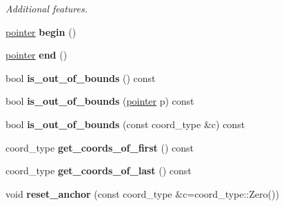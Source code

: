 \begin{DoxyCompactItemize}
\begin{DoxyCompactList}\small\item\em Additional features. \end{DoxyCompactList}\item 
\hypertarget{class_d_o_1_1_locator_ab90f1f06efb41eee9fb48cd37dfbdccd}{\hyperlink{class_d_o_1_1_locator_aa2158dc2d25210ef557a40d3b8a521e3}{pointer} {\bfseries begin} ()}\label{class_d_o_1_1_locator_ab90f1f06efb41eee9fb48cd37dfbdccd}

\item 
\hypertarget{class_d_o_1_1_locator_a13c6690dd32b33d4bc6e3ae6897ca432}{\hyperlink{class_d_o_1_1_locator_aa2158dc2d25210ef557a40d3b8a521e3}{pointer} {\bfseries end} ()}\label{class_d_o_1_1_locator_a13c6690dd32b33d4bc6e3ae6897ca432}

\item 
\hypertarget{class_d_o_1_1_locator_a1bcb35403b8b8b24885e62614ac7619f}{bool {\bfseries is\-\_\-out\-\_\-of\-\_\-bounds} () const }\label{class_d_o_1_1_locator_a1bcb35403b8b8b24885e62614ac7619f}

\item 
\hypertarget{class_d_o_1_1_locator_acb17ad0e9cac4a4740fcb8ade0825ebc}{bool {\bfseries is\-\_\-out\-\_\-of\-\_\-bounds} (\hyperlink{class_d_o_1_1_locator_aa2158dc2d25210ef557a40d3b8a521e3}{pointer} p) const }\label{class_d_o_1_1_locator_acb17ad0e9cac4a4740fcb8ade0825ebc}

\item 
\hypertarget{class_d_o_1_1_locator_a5f837e03969e4f1af33017f9dea5b960}{bool {\bfseries is\-\_\-out\-\_\-of\-\_\-bounds} (const coord\-\_\-type \&c) const }\label{class_d_o_1_1_locator_a5f837e03969e4f1af33017f9dea5b960}

\item 
\hypertarget{class_d_o_1_1_locator_a384ff954aa602ae0ba4dc4caacf06e51}{coord\-\_\-type {\bfseries get\-\_\-coords\-\_\-of\-\_\-first} () const }\label{class_d_o_1_1_locator_a384ff954aa602ae0ba4dc4caacf06e51}

\item 
\hypertarget{class_d_o_1_1_locator_aaf19309c77f646830101b7abf0b3a2be}{coord\-\_\-type {\bfseries get\-\_\-coords\-\_\-of\-\_\-last} () const }\label{class_d_o_1_1_locator_aaf19309c77f646830101b7abf0b3a2be}

\item 
\hypertarget{class_d_o_1_1_locator_a94ebecd99f198eb2e0563fab74665af6}{void {\bfseries reset\-\_\-anchor} (const coord\-\_\-type \&c=coord\-\_\-type\-::\-Zero())}\label{class_d_o_1_1_locator_a94ebecd99f198eb2e0563fab74665af6}


\end{DoxyCompactItemize}
